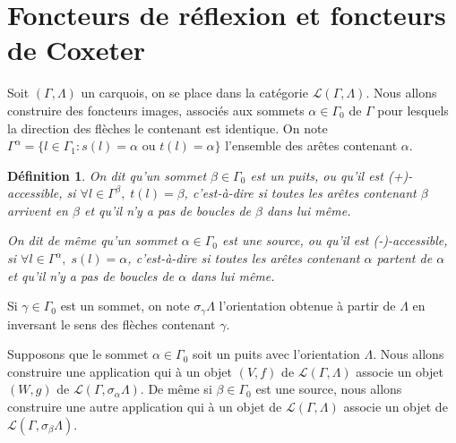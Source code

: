 \documentclass[a4paper,10pt]{article}
\newtheorem{defi}[]{Définition}[section]
\begin{document}
\clearpage
\section{Foncteurs de réflexion et foncteurs de Coxeter}
Soit $(\Gamma,\Lambda)$ un carquois, on se place dans la catégorie $\mathscr{L}(\Gamma,\Lambda)$. Nous allons construire des foncteurs images, associés aux sommets $\alpha \in \Gamma_{0}$ de $\Gamma$ pour lesquels la direction des flèches le contenant est identique. On note $\Gamma^{\alpha}=\{ l\in \Gamma_{1} : s(l)=\alpha\text{ ou }t(l)=\alpha\}$ l'ensemble des arêtes contenant $\alpha$.

\begin{defi}
	On dit qu'un sommet $\beta \in \Gamma_{0}$ est un \emph{puits}, ou qu'il est (+)-accessible, si $\forall l \in \Gamma^{\beta},\; t(l)=\beta$, c'est-à-dire si toutes les arêtes contenant $\beta$ arrivent en $\beta$ et qu'il n'y a pas de boucles de $\beta$ dans lui même.

	On dit de même qu'un sommet $\alpha \in \Gamma_{0}$ est une \emph{source}, ou qu'il est (-)-accessible, si $\forall l \in \Gamma^{\alpha},\; s(l)=\alpha$, c'est-à-dire si toutes les arêtes contenant $\alpha$ partent de $\alpha$ et qu'il n'y a pas de boucles de $\alpha$ dans lui même.
\end{defi}


Si $\gamma \in \Gamma_0$ est un sommet, on note $\sigma_{\gamma}\Lambda$ l'orientation obtenue à partir de $\Lambda$ en inversant le sens des flèches contenant $\gamma$.

Supposons que le sommet $\alpha \in \Gamma_{0}$ soit un puits avec l'orientation $\Lambda$.  Nous allons construire une application qui à un objet $(V,f)$ de $\mathscr{L}(\Gamma,\Lambda)$ associe un objet $(W,g)$ de $\mathscr{L}(\Gamma,\sigma_{\alpha}\Lambda)$. De même si $\beta \in \Gamma_0$ est une source, nous allons construire une autre application qui à un objet de $\mathscr L(\Gamma,\Lambda)$ associe un objet de $\mathscr L(\Gamma,\sigma_{\beta}\Lambda)$. 
\end{document}
